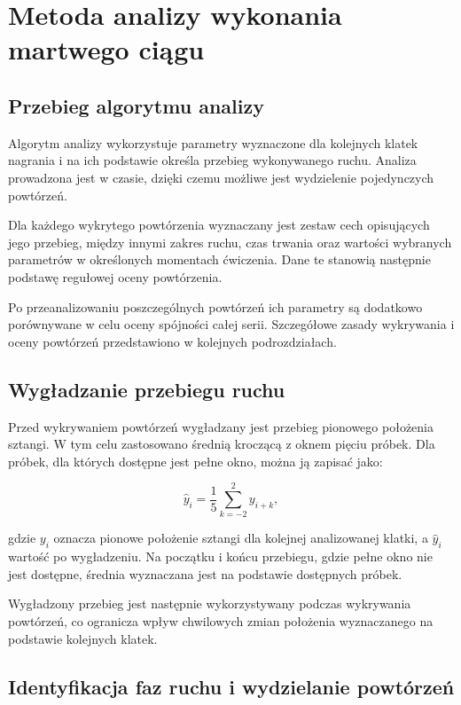 \section{Metoda analizy wykonania martwego ciągu}

\subsection{Przebieg algorytmu analizy}

Algorytm analizy wykorzystuje parametry wyznaczone dla kolejnych klatek nagrania i na ich podstawie określa przebieg wykonywanego ruchu. Analiza prowadzona jest w czasie, dzięki czemu możliwe jest wydzielenie pojedynczych powtórzeń.

Dla każdego wykrytego powtórzenia wyznaczany jest zestaw cech opisujących jego przebieg, między innymi zakres ruchu, czas trwania oraz wartości wybranych parametrów w określonych momentach ćwiczenia. Dane te stanowią następnie podstawę regułowej oceny powtórzenia.

Po przeanalizowaniu poszczególnych powtórzeń ich parametry są dodatkowo porównywane w celu oceny spójności całej serii. Szczegółowe zasady wykrywania i oceny powtórzeń przedstawiono w kolejnych podrozdziałach.

\subsection{Wygładzanie przebiegu ruchu}

Przed wykrywaniem powtórzeń wygładzany jest przebieg pionowego położenia sztangi. W tym celu zastosowano średnią kroczącą z oknem pięciu próbek. Dla próbek, dla których dostępne jest pełne okno, można ją zapisać jako:

\begin{equation}
\hat{y}_i =
\frac{1}{5}
\sum_{k=-2}^{2} y_{i+k},
\end{equation}

gdzie \(y_i\) oznacza pionowe położenie sztangi dla kolejnej analizowanej klatki, a \(\hat{y}_i\) wartość po wygładzeniu. Na początku i końcu przebiegu, gdzie pełne okno nie jest dostępne, średnia wyznaczana jest na podstawie dostępnych próbek.

Wygładzony przebieg jest następnie wykorzystywany podczas wykrywania powtórzeń, co ogranicza wpływ chwilowych zmian położenia wyznaczanego na podstawie kolejnych klatek.

\subsection{Identyfikacja faz ruchu i wydzielanie powtórzeń}


